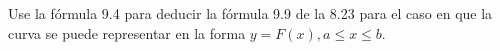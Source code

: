 \item Use la fórmula 9.4 para deducir la fórmula 9.9 de la 8.23 para el caso en que la curva se puede representar en la forma $y = F(x), a \le x \le b$.
